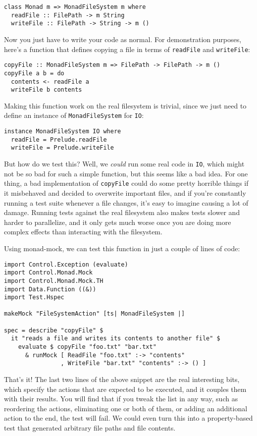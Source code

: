 \begin{verbatim}
class Monad m => MonadFileSystem m where
  readFile :: FilePath -> m String
  writeFile :: FilePath -> String -> m ()
\end{verbatim}
Now you just have to write your code as normal. For demonstration
purposes, here's a function that defines copying a file in terms of
\texttt{readFile} and \texttt{writeFile}:

\begin{verbatim}
copyFile :: MonadFileSystem m => FilePath -> FilePath -> m ()
copyFile a b = do
  contents <- readFile a
  writeFile b contents
\end{verbatim}
Making this function work on the real filesystem is trivial, since we
just need to define an instance of \texttt{MonadFileSystem} for
\texttt{IO}:

\begin{verbatim}
instance MonadFileSystem IO where
  readFile = Prelude.readFile
  writeFile = Prelude.writeFile
\end{verbatim}
But how do we test this? Well, we \emph{could} run some real code in
\texttt{IO}, which might not be so bad for such a simple function, but
this seems like a bad idea. For one thing, a bad implementation of
\texttt{copyFile} could do some pretty horrible things if it misbehaved
and decided to overwrite important files, and if you're constantly
running a test suite whenever a file changes, it's easy to imagine
causing a lot of damage. Running tests against the real filesystem also
makes tests slower and harder to parallelize, and it only gets much
worse once you are doing more complex effects than interacting with the
filesystem.

Using monad-mock, we can test this function in just a couple of lines of
code:

\begin{verbatim}
import Control.Exception (evaluate)
import Control.Monad.Mock
import Control.Monad.Mock.TH
import Data.Function ((&))
import Test.Hspec

makeMock "FileSystemAction" [ts| MonadFileSystem |]

spec = describe "copyFile" $
  it "reads a file and writes its contents to another file" $
    evaluate $ copyFile "foo.txt" "bar.txt"
      & runMock [ ReadFile "foo.txt" :-> "contents"
                , WriteFile "bar.txt" "contents" :-> () ]
\end{verbatim}
That's it!
The last two lines of the above snippet are the real interesting bits,
which specify the actions that are expected to be executed, and it
couples them with their results. You will find that if you tweak the
list in any way, such as reordering the actions, eliminating one or both
of them, or adding an additional action to the end, the test will fail.
We could even turn this into a property-based test that generated
arbitrary file paths and file contents.

